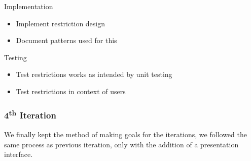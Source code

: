   Implementation
  \begin{itemize}
    \item Implement restriction design
    \item Document patterns used for this
  \end{itemize}

  Testing
  \begin{itemize}
    \item Test restrictions works as intended by unit testing
    \item Test restrictions in context of users
  \end{itemize}

\subsubsection{4\textsuperscript{th} Iteration}

  We finally kept the method of making goals for the iterations, we followed the same process as previous iteration, only with the addition of a presentation interface.
